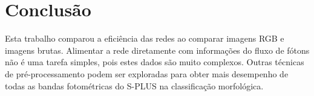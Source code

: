 \section{Conclusão}

Esta trabalho comparou a eficiência das redes ao comparar imagens RGB e imagens brutas. Alimentar a rede diretamente com informações do fluxo de fótons não é uma tarefa simples, pois estes dados são muito complexos. Outras técnicas de pré-processamento podem ser exploradas para obter mais desempenho de todas as bandas fotométricas do S-PLUS na classificação morfológica.

\pagebreak

